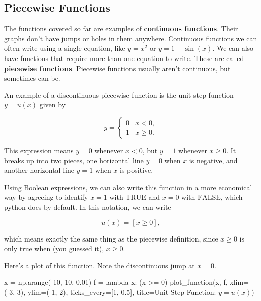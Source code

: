\documentclass[
  letterpaper,
  DIV=11,
  numbers=noendperiod]{scrreprt}
\newenvironment{Shaded}{\begin{snugshade}}{\end{snugshade}}
\newcommand{\DecValTok}[1]{\textcolor[rgb]{0.68,0.00,0.00}{#1}}
\newcommand{\FloatTok}[1]{\textcolor[rgb]{0.68,0.00,0.00}{#1}}
\newcommand{\KeywordTok}[1]{\textcolor[rgb]{0.00,0.23,0.31}{#1}}
\newcommand{\NormalTok}[1]{\textcolor[rgb]{0.00,0.23,0.31}{#1}}
\newcommand{\OperatorTok}[1]{\textcolor[rgb]{0.37,0.37,0.37}{#1}}
\newcommand{\StringTok}[1]{\textcolor[rgb]{0.13,0.47,0.30}{#1}}
\begin{document}
\hypertarget{piecewise-functions}{%
\subsection{Piecewise Functions}\label{piecewise-functions}}

The functions covered so far are examples of \textbf{continuous
functions}. Their graphs don't have jumps or holes in them anywhere.
Continuous functions we can often write using a single equation, like
\(y=x^2\) or \(y=1 + \sin(x)\). We can also have functions that require
more than one equation to write. These are called \textbf{piecewise
functions}. Piecewise functions usually aren't continuous, but sometimes
can be.

An example of a discontinuous piecewise function is the unit step
function \(y=u(x)\) given by

\[
y = 
\begin{cases}
0 & x < 0, \\
1 & x \geq 0.
\end{cases}
\]

This expression means \(y=0\) whenever \(x < 0\), but \(y=1\) whenever
\(x \geq 0\). It breaks up into two pieces, one horizontal line \(y=0\)
when \(x\) is negative, and another horizontal line \(y=1\) when \(x\)
is positive.

Using Boolean expressions, we can also write this function in a more
economical way by agreeing to identify \(x=1\) with \(\text{TRUE}\) and
\(x=0\) with \(\text{FALSE}\), which python does by default. In this
notation, we can write

\[u(x) = [x \geq 0],\]

which means exactly the same thing as the piecewise definition, since
\(x \geq 0\) is only true when (you guessed it), \(x \geq 0\).

Here's a plot of this function. Note the discontinuous jump at \(x=0\).

\begin{Shaded}
\begin{Highlighting}[]
\NormalTok{x }\OperatorTok{=}\NormalTok{ np.arange(}\OperatorTok{{-}}\DecValTok{10}\NormalTok{, }\DecValTok{10}\NormalTok{, }\FloatTok{0.01}\NormalTok{)}
\NormalTok{f }\OperatorTok{=} \KeywordTok{lambda}\NormalTok{ x:  (x }\OperatorTok{\textgreater{}=} \DecValTok{0}\NormalTok{)}
\NormalTok{plot\_function(x, f, xlim}\OperatorTok{=}\NormalTok{(}\OperatorTok{{-}}\DecValTok{3}\NormalTok{, }\DecValTok{3}\NormalTok{), ylim}\OperatorTok{=}\NormalTok{(}\OperatorTok{{-}}\DecValTok{1}\NormalTok{, }\DecValTok{2}\NormalTok{), ticks\_every}\OperatorTok{=}\NormalTok{[}\DecValTok{1}\NormalTok{, }\FloatTok{0.5}\NormalTok{], }
\NormalTok{              title}\OperatorTok{=}\StringTok{\textquotesingle{}Unit Step Function: $y=u(x)$\textquotesingle{}}\NormalTok{)}
\end{Highlighting}
\end{Shaded}
\end{document}
